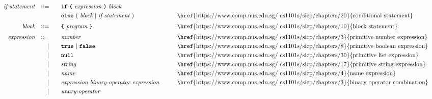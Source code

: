 \begin{alignat*}{9}
&& \textit{if-statement} && ::= &\quad &&  \textbf{\texttt{if}}\
                                   \textbf{\texttt{(}}\ \textit{expression} \ \textbf{\texttt{)}}\ 
                                   \textit{block} \\
&&                       &&     &      && \textbf{\texttt{else}}\
                                          (\ \textit{block}
                                          \ | \
                                          \textit{if-statement} \ )
                                                            && \textrm{\href{https://www.comp.nus.edu.sg/~cs1101s/sicp/chapters/20}{conditional statement}} \\[1mm]
&& \textit{block}        && ::= &      && \textbf{\texttt{\{}}\  \textit{program}   \ \textbf{\texttt{\}}} \quad
                                                           && \textrm{\href{https://www.comp.nus.edu.sg/~cs1101s/sicp/chapters/10}{block statement}} \\[1mm]         
&& \textit{expression}   && ::= &\quad &&  \textit{number}   && \textrm{\href{https://www.comp.nus.edu.sg/~cs1101s/sicp/chapters/3}{primitive number expression}}\\
&&                       && |   &\quad && \textbf{\texttt{true}}\ |\ \textbf{\texttt{false}}
                                                           && \textrm{\href{https://www.comp.nus.edu.sg/~cs1101s/sicp/chapters/8}{primitive boolean expression}} \\
&&                       && |   &\quad && \textbf{\texttt{null}}
                                                           && \textrm{\href{https://www.comp.nus.edu.sg/~cs1101s/sicp/chapters/30}{primitive list expression}} \\
&&                       && |   &\quad &&  \textit{string}   && \textrm{\href{https://www.comp.nus.edu.sg/~cs1101s/sicp/chapters/17}{primitive string expression}} \\
&&                       && |   &\quad &&  \textit{name}   && \textrm{\href{https://www.comp.nus.edu.sg/~cs1101s/sicp/chapters/4}{name expression}} \\
&&                       && |   &\quad &&  \textit{expression} \  \textit{binary-operator} \ 
                                            \textit{expression} \qquad
                                                           && \textrm{\href{https://www.comp.nus.edu.sg/~cs1101s/sicp/chapters/3}{binary operator combination}} \\
&&                       && |   &\quad &&   \textit{unary-operator} \ 

\end{alignat*}
